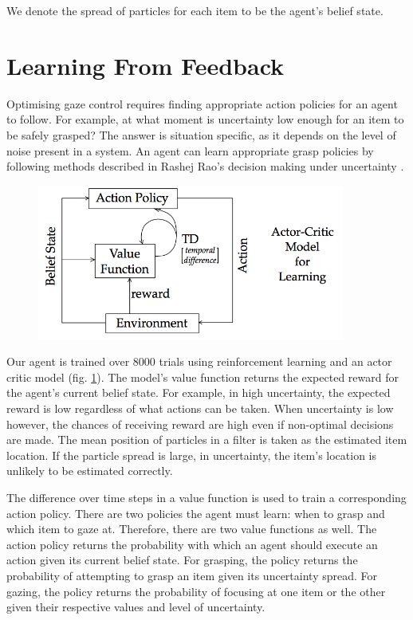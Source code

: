 \documentclass[11]{article}
\begin{document}
We denote the spread of particles for each item to be the agent's belief state. 

\section{Learning From Feedback}
Optimising gaze control requires finding appropriate action policies for an agent to follow.  
For example, at what moment is uncertainty low enough for an item to be safely grasped? 
The answer is situation specific, as it depends on the level of noise present in a system. 
An agent can learn appropriate grasp policies by following methods described in Rashej Rao's decision making under uncertainty \cite{rao2010}.

\begin{figure}[!h]
	\centering
	\includegraphics[width=0.9\textwidth]{figures/actorcritic.png}
	\caption{}
	\label{fig:actor-critic}
\end{figure} 

Our agent is trained over 8000 trials using reinforcement learning and an actor critic model (fig. \ref{fig:actor-critic}). 
The model's value function returns the expected reward for the agent's current belief state.
For example, in high uncertainty, the expected reward is low regardless of what actions can be taken.
When uncertainty is low however, the chances of receiving reward are high even if non-optimal decisions are made.  
The mean position of particles in a filter is taken as the estimated item location.
If the particle spread is large, in uncertainty, the item's location is unlikely to be estimated correctly. 

The difference over time steps in a value function is used to train a corresponding action policy.
There are two policies the agent must learn: when to grasp and which item to gaze at.
Therefore, there are two value functions as well. 
The action policy returns the probability with which an agent should execute an action given its current belief state.
For grasping, the policy returns the probability of attempting to grasp an item given its uncertainty spread.
For gazing, the policy returns the probability of focusing at one item or the other given their respective values and level of uncertainty.
\end{document}
